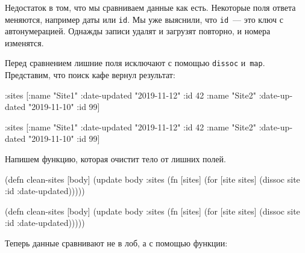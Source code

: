 \fi

Недостаток в том, что мы сравниваем данные как есть. Некоторые поля ответа
меняются, например даты или \verb|id|. Мы уже выяснили, что \verb|id|~--- это
ключ с автонумерацией. Однажды записи удалят и загрузят повторно, и номера
изменятся.

Перед сравнением лишние поля исключают с помощью \verb|dissoc|
и~\verb|map|. Представим, что поиск кафе вернул результат:

\ifx\DEVICETYPE\MOBILE

\begin{english}
  \begin{clojure}
{:sites [{:name "Site1"
          :date-updated "2019-11-12"
          :id 42}
         {:name "Site2"
          :date-updated "2019-11-10"
          :id 99}]}
  \end{clojure}
\end{english}

\else

\begin{english}
  \begin{clojure}
{:sites [{:name "Site1" :date-updated "2019-11-12" :id 42}
         {:name "Site2" :date-updated "2019-11-10" :id 99}]}
  \end{clojure}
\end{english}

\fi


\noindent
Напишем функцию, которая очистит тело от лишних полей.

\ifx\DEVICETYPE\MOBILE

\begin{english}
  \begin{clojure}
(defn clean-sites [body]
 (update body :sites
  (fn [sites]
   (for [site sites]
    (dissoc site :id :date-updated)))))
  \end{clojure}
\end{english}

\else

\begin{english}
  \begin{clojure}
(defn clean-sites [body]
  (update body :sites
          (fn [sites]
            (for [site sites]
              (dissoc site :id :date-updated)))))
  \end{clojure}
\end{english}

\fi

\noindent
Теперь данные сравнивают не в лоб, а с помощью функции:

